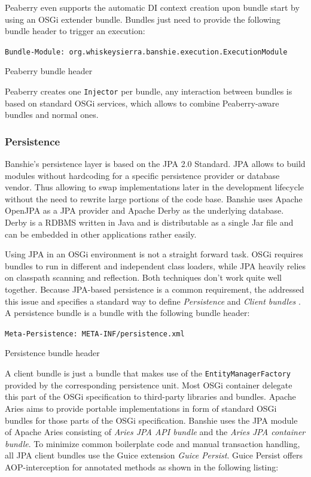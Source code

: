 Peaberry even supports the automatic \gls{DI} context creation upon bundle start by using an OSGi extender bundle. Bundles just need to provide the following bundle header to trigger an execution:

\begin{listing}[H]
\texttt{Bundle-Module: org.whiskeysierra.banshie.execution.ExecutionModule}
\caption{Peaberry bundle header}
\end{listing}

Peaberry creates one \texttt{Injector} per bundle, any interaction between bundles is based on standard OSGi services, which allows to combine Peaberry-aware bundles and normal ones.

\subsubsection{Persistence}
Banshie's persistence layer is based on the \gls{JPA} 2.0 Standard. \gls{JPA} allows to build modules without hardcoding for a specific persistence provider or database vendor. Thus allowing to swap implementations later in the development lifecycle without the need to rewrite large portions of the code base. Banshie uses Apache OpenJPA as a \gls{JPA} provider and Apache Derby as the underlying database. Derby is a \gls{RDBMS} written in Java and is distributable as a single Jar file and can be embedded in other applications rather easily.

Using \gls{JPA} in an \gls{OSGi} environment is not a straight forward task. \gls{OSGi} requires bundles to run in different and independent class loaders, while \gls{JPA} heavily relies on classpath scanning and reflection. Both techniques don't work quite well together. Because \gls{JPA}-based persistence is a common requirement, the  addressed this issue and specifies a standard way to define \textit{Persistence} and \textit{Client bundles} \cite{OSGI:Enterprise}. A persistence bundle is a bundle with the following bundle header:

\begin{listing}[H]
\texttt{Meta-Persistence: META-INF/persistence.xml}
\caption{Persistence bundle header}
\end{listing}

A client bundle is just a bundle that makes use of the \texttt{EntityManagerFactory} provided by the corresponding persistence unit. Most \gls{OSGi} container delegate this part of the \gls{OSGi} specification to third-party libraries and bundles. Apache Aries aims to provide portable implementations in form of standard \gls{OSGi} bundles for those parts of the \gls{OSGi} specification. Banshie uses the JPA module of Apache Aries consisting of \textit{Aries JPA API bundle} and the \textit{Aries JPA container bundle}. To minimize common boilerplate code and manual transaction handling, all \gls{JPA} client bundles use the Guice extension \textit{Guice Persist}. Guice Persist offers AOP-interception for annotated methods as shown in the following listing:

